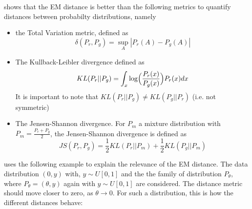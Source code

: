 \documentclass[11pt,a4paper,twoside]{report}
\begin{document}
\cite{arjovsky2017wasserstein} shows that the EM distance is better than the following metrics to quantify distances between probabilty distributions, namely

\begin{itemize}
    \item the Total Variation metric, defined as
    \begin{equation}
        \delta(P_r, P_g) = \sup_{A} |P_r(A) -  P_g(A)|
    \end{equation}
    \item The Kullback-Leibler divergence defined as
    \begin{equation}
        KL(P_r||P_g) = \int_x  \log \Bigl( \frac{P_r(x)}{P_g(x)} \Bigr) P_r(x) dx
    \end{equation}
    It is important to note that $KL(P_r||P_g) \neq KL(P_g||P_r)$ (i.e. not symmetric)
    \item The Jensen-Shannon divergence. For $P_m$ a mixture distribution with $P_m = \frac{P_r + P_g}{2}$, the Jensen-Shannon divergence is defined as  
    \begin{equation}
        JS(P_r, P_g) = \frac{1}{2} KL(P_r||P_m) + \frac{1}{2} KL(P_g||P_m)
    \end{equation}
\end{itemize}

\cite{arjovsky2017wasserstein} uses the following example to explain the relevance of the EM distance. The data distribution $(0, y)$ with, $y \sim U[0,1]$ and the the family of distribution $P_{\theta}$, where $P_{\theta} = (\theta, y)$ again with $y \sim U[0,1]$ are considered. The distance metric should move closer to zero, as $\theta \rightarrow 0$. For such a distribution, this is how the different distances behave:
\end{document}

